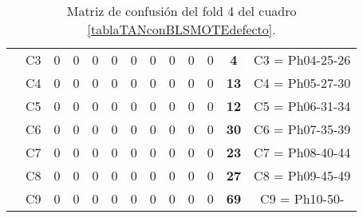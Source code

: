 \begin{table}[H]
{\begin{tabular}{|ccrrrrrrrrrrc|}
\multicolumn{1}{|c|}{}                                      & \multicolumn{1}{c|}{C3} & \multicolumn{1}{c|}{0}  & \multicolumn{1}{c|}{0}  & \multicolumn{1}{c|}{0}  & \multicolumn{1}{c|}{0}  & \multicolumn{1}{c|}{0}  & \multicolumn{1}{c|}{0}  & \multicolumn{1}{c|}{0}  & \multicolumn{1}{c|}{0}  & \multicolumn{1}{c|}{0}  & \multicolumn{1}{c|}{\textbf{4}}  & C3 = Ph04-25-26   \\ \cline{2-13}
\multicolumn{1}{|c|}{}                                      & \multicolumn{1}{c|}{C4} & \multicolumn{1}{c|}{0}  & \multicolumn{1}{c|}{0}  & \multicolumn{1}{c|}{0}  & \multicolumn{1}{c|}{0}  & \multicolumn{1}{c|}{0}  & \multicolumn{1}{c|}{0}  & \multicolumn{1}{c|}{0}  & \multicolumn{1}{c|}{0}  & \multicolumn{1}{c|}{0}  & \multicolumn{1}{c|}{\textbf{13}} & C4 = Ph05-27-30   \\ \cline{2-13}
\multicolumn{1}{|c|}{}                                      & \multicolumn{1}{c|}{C5} & \multicolumn{1}{c|}{0}  & \multicolumn{1}{c|}{0}  & \multicolumn{1}{c|}{0}  & \multicolumn{1}{c|}{0}  & \multicolumn{1}{c|}{0}  & \multicolumn{1}{c|}{0}  & \multicolumn{1}{c|}{0}  & \multicolumn{1}{c|}{0}  & \multicolumn{1}{c|}{0}  & \multicolumn{1}{c|}{\textbf{12}} & C5 = Ph06-31-34   \\ \cline{2-13}
\multicolumn{1}{|c|}{}                                      & \multicolumn{1}{c|}{C6} & \multicolumn{1}{c|}{0}  & \multicolumn{1}{c|}{0}  & \multicolumn{1}{c|}{0}  & \multicolumn{1}{c|}{0}  & \multicolumn{1}{c|}{0}  & \multicolumn{1}{c|}{0}  & \multicolumn{1}{c|}{0}  & \multicolumn{1}{c|}{0}  & \multicolumn{1}{c|}{0}  & \multicolumn{1}{c|}{\textbf{30}} & C6 = Ph07-35-39   \\ \cline{2-13}
\multicolumn{1}{|c|}{}                                      & \multicolumn{1}{c|}{C7} & \multicolumn{1}{c|}{0}  & \multicolumn{1}{c|}{0}  & \multicolumn{1}{c|}{0}  & \multicolumn{1}{c|}{0}  & \multicolumn{1}{c|}{0}  & \multicolumn{1}{c|}{0}  & \multicolumn{1}{c|}{0}  & \multicolumn{1}{c|}{0}  & \multicolumn{1}{c|}{0}  & \multicolumn{1}{c|}{\textbf{23}} & C7 = Ph08-40-44   \\ \cline{2-13}
\multicolumn{1}{|c|}{}                                      & \multicolumn{1}{c|}{C8} & \multicolumn{1}{c|}{0}  & \multicolumn{1}{c|}{0}  & \multicolumn{1}{c|}{0}  & \multicolumn{1}{c|}{0}  & \multicolumn{1}{c|}{0}  & \multicolumn{1}{c|}{0}  & \multicolumn{1}{c|}{0}  & \multicolumn{1}{c|}{0}  & \multicolumn{1}{c|}{0}  & \multicolumn{1}{c|}{\textbf{27}} & C8 = Ph09-45-49   \\ \cline{2-13}
\multicolumn{1}{|c|}{}                                      & \multicolumn{1}{c|}{C9} & \multicolumn{1}{c|}{0}  & \multicolumn{1}{c|}{0}  & \multicolumn{1}{c|}{0}  & \multicolumn{1}{c|}{0}  & \multicolumn{1}{c|}{0}  & \multicolumn{1}{c|}{0}  & \multicolumn{1}{c|}{0}  & \multicolumn{1}{c|}{0}  & \multicolumn{1}{c|}{0}  & \multicolumn{1}{c|}{\textbf{69}} & C9 = Ph10-50-     \\ \hline
\end{tabular}%
}
\caption{Matriz de confusión del fold 4 del cuadro \ref{tablaTANconBLSMOTEdefecto}.}
\end{table}

